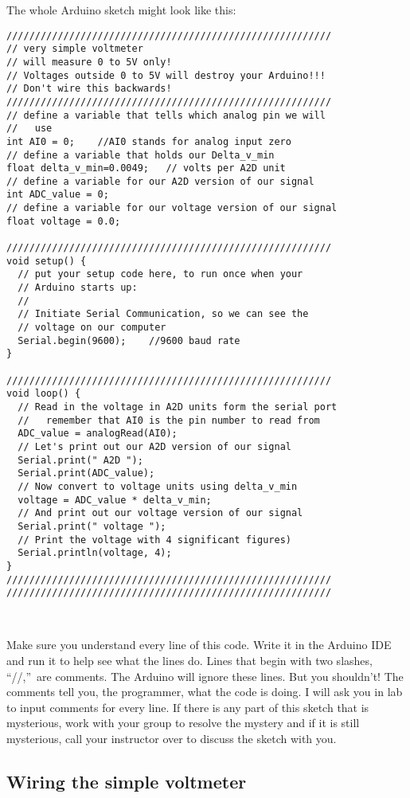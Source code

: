 The whole Arduino sketch might look like this:
\begin{lstlisting}[language=Arduino]
/////////////////////////////////////////////////////////
// very simple voltmeter
// will measure 0 to 5V only!
// Voltages outside 0 to 5V will destroy your Arduino!!!
// Don't wire this backwards!
/////////////////////////////////////////////////////////
// define a variable that tells which analog pin we will 
//   use
int AI0 = 0;    //AI0 stands for analog input zero
// define a variable that holds our Delta_v_min
float delta_v_min=0.0049;   // volts per A2D unit
// define a variable for our A2D version of our signal
int ADC_value = 0;
// define a variable for our voltage version of our signal
float voltage = 0.0;
 
/////////////////////////////////////////////////////////
void setup() {
  // put your setup code here, to run once when your
  // Arduino starts up:
  //
  // Initiate Serial Communication, so we can see the
  // voltage on our computer
  Serial.begin(9600);    //9600 baud rate
}
 
/////////////////////////////////////////////////////////
void loop() {
  // Read in the voltage in A2D units form the serial port
  //   remember that AI0 is the pin number to read from
  ADC_value = analogRead(AI0); 
  // Let's print out our A2D version of our signal
  Serial.print(" A2D ");
  Serial.print(ADC_value); 
  // Now convert to voltage units using delta_v_min
  voltage = ADC_value * delta_v_min;
  // And print out our voltage version of our signal
  Serial.print(" voltage ");
  // Print the voltage with 4 significant figures)
  Serial.println(voltage, 4);  
}
/////////////////////////////////////////////////////////
/////////////////////////////////////////////////////////
 \end{lstlisting}

\ 

Make sure you understand every line of this code. Write it in the Arduino
IDE and run it to help see what the lines do. Lines that begin with two
slashes, \textquotedblleft //,\textquotedblright\ are comments. The Arduino
will ignore these lines. But you shouldn't! The comments tell you, the
programmer, what the code is doing. I will ask you in lab to input comments
for every line. If there is any part of this sketch that is mysterious, work
with your group to resolve the mystery and if it is still mysterious, call
your instructor over to discuss the sketch with you.

\subsection{Wiring the simple voltmeter}

